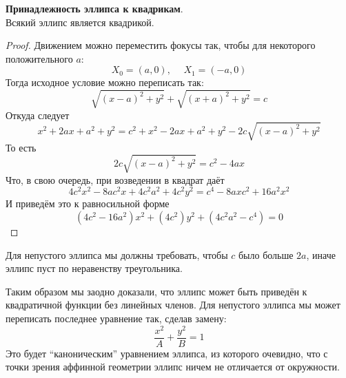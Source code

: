 \documentclass[11pt]{report}
\begin{document}
    \begin{lemma}
    \textbf{Принадлежность эллипса к квадрикам}.\\ Всякий эллипс является квадрикой.
    \end{lemma}

    \begin{proof}
    Движением можно переместить фокусы так, чтобы для некоторого положительного $a$:
    \begin{equation*}
        X_0 = (a, 0), \hspace{15pt} X_1 = (-a, 0)
    \end{equation*}
    Тогда исходное условие можно переписать так:
    \begin{equation*}
        \sqrt{(x - a)^2 + y^2} + \sqrt{(x + a)^2 + y^2} = c
    \end{equation*}
    Откуда следует
    \begin{equation*}
        x^2 + 2ax + a^2 + y^2 = c^2 + x^2 -2ax + a^2 + y^2 - 2c\sqrt{(x - a)^2 + y^2}
    \end{equation*}
    То есть
    \begin{equation*}
        2c\sqrt{(x - a)^2 + y^2} = c^2 - 4ax
    \end{equation*}
    Что, в свою очередь, при возведении в квадрат даёт
    \begin{equation*}
        4c^2x^2 - 8ac^2x + 4c^2a^2 + 4c^2y^2 = c^4 - 8axc^2 + 16a^2x^2
    \end{equation*}
    И приведём это к равносильной форме
    \begin{equation*}
        (4c^2 - 16a^2)x^2 + (4c^2)y^2 + (4c^2a^2 - c^4) = 0
    \end{equation*}
    \end{proof}

    \begin{remark}
    Для непустого эллипса мы должны требовать, чтобы $c$ было больше $2a$, иначе эллипс пуст по неравенству треугольника.
    \end{remark}

    \begin{remark}
    Таким образом мы заодно доказали, что эллипс может быть приведён к квадратичной функции без линейных членов. Для непустого эллипса мы может переписать последнее уравнение так, сделав замену:
    \begin{equation*}
        \dfrac{x^2}{A} + \dfrac{y^2}{B} = 1
    \end{equation*}
    Это будет ``каноническим'' уравнением эллипса, из которого очевидно, что с точки зрения аффинной геометрии эллипс ничем не отличается от окружности.
    \end{remark}
\end{document}
